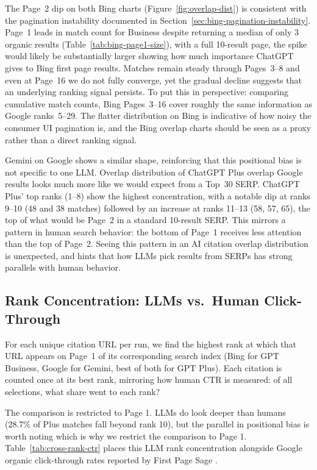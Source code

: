 The Page~2 dip on both Bing charts (Figure~\ref{fig:overlap-dist}) is consistent with the pagination
instability documented in Section~\ref{sec:bing-pagination-instability}.
Page~1 leads in match count for Business despite returning a median of only
3 organic results (Table~\ref{tab:bing-page1-size}), with a full 10-result page,
the spike would likely be substantially larger showing how much importance ChatGPT 
gives to Bing first page results.
Matches remain steady through Pages~3--8 and even at Page~16 we do not fully converge, yet
the gradual decline suggests that an underlying ranking signal persists.
To put this in perspective: comparing cumulative match counts, Bing Pages~3--16
cover roughly the same information as Google ranks~5--29.
The flatter distribution on Bing is indicative of how noisy the consumer UI pagination is,
and the Bing overlap charts should be seen as a proxy rather than a direct ranking signal.

Gemini on Google shows a similar shape, reinforcing that this positional bias is not
specific to one LLM.
Overlap distribution of ChatGPT Plus overlap Google results looks much more like we would expect from a Top~30 SERP.
ChatGPT Plus' top ranks (1--8) show the highest concentration, with a notable dip at
ranks 9--10 (48 and 38 matches) followed by an increase at ranks 11--13 (58, 57, 65), the
top of what would be Page~2 in a standard 10-result SERP.
This mirrors a pattern in human search behavior: the bottom of Page~1
receives less attention than the top of Page~2.
Seeing this pattern in an AI citation overlap distribution is unexpected, and hints that
how LLMs pick results from SERPs has strong parallels with human behavior.


\subsection{Rank Concentration: LLMs vs.\ Human Click-Through}
\label{sec:gemini-google-rank}
\label{sec:cross-system-rank}

For each unique citation URL per run, we find the highest rank at which that URL appears on Page~1 of its corresponding search index (Bing for GPT Business, Google for Gemini, best of both for GPT Plus). Each citation is counted once at its best rank, mirroring how human CTR is measured: of all selections, what share went to each rank?

The comparison is restricted to Page 1. LLMs do look deeper than humans (28.7\% of Plus matches fall beyond rank 10), but the parallel in positional bias is worth noting which is why we restrict the comparison to Page 1. 
Table~\ref{tab:cross-rank-ctr} places this LLM rank concentration alongside Google organic click-through rates reported by First Page Sage \parencite{firstpagesage2026ctr}.

